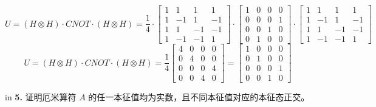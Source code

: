 \documentclass[11pt]{article}
\begin{document}
\begin{enumerate}
\begin{enumerate}
        \[
        U = (H \otimes H) \cdot CNOT \cdot (H \otimes H)
          = \frac{1}{4} \cdot \begin{bmatrix}
            1 & 1 & 1 & 1 \\ 
            1 & -1 & 1 & -1 \\ 
            1 & 1 & -1 & -1 \\ 
            1 & -1 & -1 & 1 
            \end{bmatrix} 
            \cdot
            \begin{bmatrix} 
            1 & 0 & 0 & 0 \\ 
            0 & 0 & 0 & 1 \\ 
            0 & 0 & 1 & 0 \\ 
            0 & 1 & 0 & 0 
            \end{bmatrix}
            \cdot
            \begin{bmatrix}
            1 & 1 & 1 & 1 \\ 
            1 & -1 & 1 & -1 \\ 
            1 & 1 & -1 & -1 \\ 
            1 & -1 & -1 & 1 
            \end{bmatrix}
        \]
        \[
            U = (H \otimes H) \cdot CNOT \cdot (H \otimes H)
            = \dfrac{1}{4}
            \begin{bmatrix}
                4 & 0 & 0 & 0 \\
                0 & 4 & 0 & 0 \\
                0 & 0 & 0 & 4 \\
                0 & 0 & 4 & 0
            \end{bmatrix}
            = \begin{bmatrix}
                1 & 0 & 0 & 0 \\
                0 & 1 & 0 & 0 \\
                0 & 0 & 0 & 1 \\
                0 & 0 & 1 & 0
            \end{bmatrix}
        \]
    \end{enumerate}

\end{enumerate}


 in
\newpage
{\bf 5.} 证明厄米算符 $A$ 的任一本征值均为实数，且不同本征值对应的本征态正交。
\end{document}
